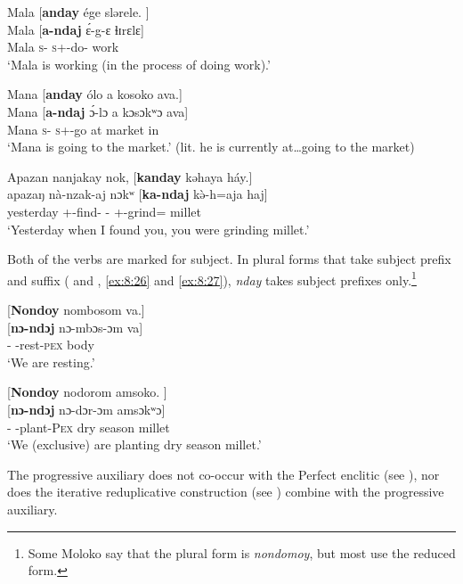 \ea \label{ex:8:23}
Mala  [\textbf{anday} ége  slərele. ]\\
\gll  Mala [\textbf{a-ndaj}  \'{ɛ}{}-g-ɛ  ɬɪrɛlɛ]\\
      Mala   \textsc{s}-{\PRG}    \textsc{s}+{\IFV}-do-{\CL}  work\\
\glt  ‘Mala is working (in the process of doing work).’
\z

\ea \label{ex:8:24}
Mana [\textbf{anday} ólo  a  kosoko  ava.]\\
\gll Mana [\textbf{a-ndaj} \'{ɔ}{}-lɔ a kɔsɔkʷɔ ava]\\
Mana  \textsc{s}-{\PRG}    \textsc{s}+{\IFV}{}-go  at  market  in\\
\glt ‘Mana is going to the market.’  (lit. he is currently at…going to the market)
\z

\ea \label{ex:8:25} 
Apazan  nanjakay  nok, [\textbf{kanday} kəhaya  háy.]\\
\gll apazaŋ nà-nzak-aj nɔkʷ [\textbf{ka-ndaj} k\`{ə}-h=aja haj]\\
yesterday  {\oneS}+{\PFV}-find{}-{\CL}  {\twoS}  {\twoS}-{\PRG}    {\twoS}+{\PFV}-grind={\PLU}  millet\\
\glt ‘Yesterday when I found you, you were grinding millet.’  
\z

Both of the verbs are marked for subject. In plural forms that take subject prefix and suffix ({\oneP} and {\twoP}, \ref{ex:8:26} and \ref{ex:8:27}), \textit{nday} takes subject prefixes only.\footnote{Some Moloko say that the plural form is \textit{nondomoy}, but most use the reduced form. } 

\ea \label{ex:8:26}
{}[\textbf{Nondoy} nombosom  va.]\\
\gll  {}[\textbf{nɔ-ndɔj}  nɔ-mbɔs-ɔm   va]\\
      \oneP-{\PRG}    \oneP-rest-\textsc{pex}  body\\
\glt  ‘We are resting.’ 
\z

\ea \label{ex:8:27}
{}[\textbf{Nondoy}  nodorom amsoko. ]\\
\gll  {}[\textbf{nɔ-ndɔj}     nɔ-dɔr-ɔm amsɔkʷɔ]\\
      \oneP-{\PRG}    \oneP-plant-\textsc{Pex}  {dry season millet}\\
\glt  ‘We (exclusive) are planting dry season millet.’
\z

The progressive auxiliary does not co-occur with the Perfect enclitic (see ), nor does the iterative reduplicative construction (see ) combine with the progressive auxiliary.

